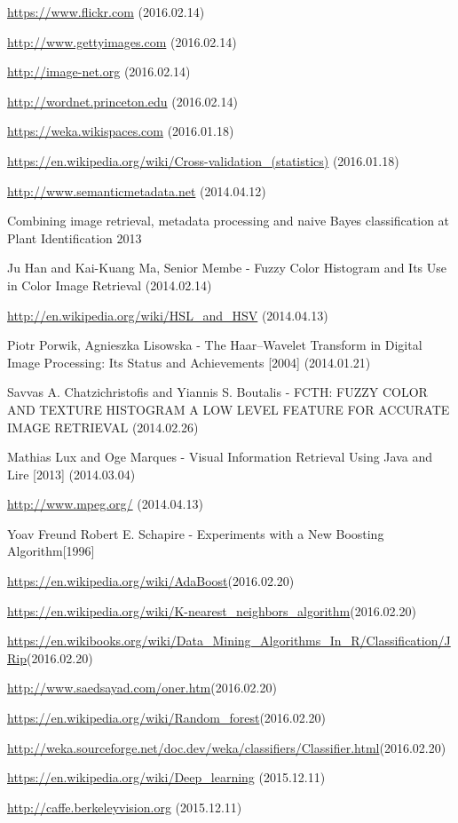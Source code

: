 \documentclass[12pt, a4paper, oneside]{book}
\theoremstyle{tetel}
\begin{document}
\newpage
\begin{thebibliography}{1}

\url{https://www.flickr.com} (2016.02.14)

\url{http://www.gettyimages.com} (2016.02.14)

\url{http://image-net.org} (2016.02.14)

\url{http://wordnet.princeton.edu} (2016.02.14)

\url{https://weka.wikispaces.com} (2016.01.18)

\url{https://en.wikipedia.org/wiki/Cross-validation_(statistics)} (2016.01.18)

\url{http://www.semanticmetadata.net} (2014.04.12)

Combining image retrieval, metadata processing and
naive Bayes classification at Plant Identification 2013

Ju Han and Kai-Kuang Ma, Senior Membe - Fuzzy Color Histogram and Its Use in Color Image Retrieval (2014.02.14)

\url{http://en.wikipedia.org/wiki/HSL_and_HSV} (2014.04.13)

Piotr Porwik, Agnieszka Lisowska - The Haar–Wavelet Transform in Digital Image Processing: Its Status and Achievements [2004] (2014.01.21)

Savvas A. Chatzichristofis and Yiannis S. Boutalis - FCTH: FUZZY COLOR AND TEXTURE HISTOGRAM 
A LOW LEVEL FEATURE FOR ACCURATE IMAGE RETRIEVAL (2014.02.26)

Mathias Lux and Oge Marques - Visual Information Retrieval Using Java and Lire [2013] (2014.03.04)

\url{http://www.mpeg.org/} (2014.04.13)

Yoav Freund Robert E. Schapire - Experiments with a New Boosting Algorithm[1996]

\url{https://en.wikipedia.org/wiki/AdaBoost}(2016.02.20)

\url{https://en.wikipedia.org/wiki/K-nearest_neighbors_algorithm}(2016.02.20)

\url{https://en.wikibooks.org/wiki/Data_Mining_Algorithms_In_R/Classification/JRip}(2016.02.20)

\url{http://www.saedsayad.com/oner.htm}(2016.02.20)

\url{https://en.wikipedia.org/wiki/Random_forest}(2016.02.20)

\url{http://weka.sourceforge.net/doc.dev/weka/classifiers/Classifier.html}(2016.02.20)

\url{https://en.wikipedia.org/wiki/Deep_learning} (2015.12.11)

\url{http://caffe.berkeleyvision.org} (2015.12.11)



\end{thebibliography}
\end{document}
